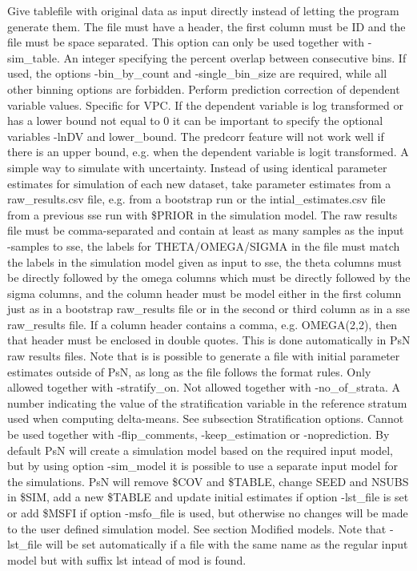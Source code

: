 \begin{optionlist}
\nextopt
{}
Give tablefile with original data as input directly instead of letting the program generate them. The file must have a header, the first column must be ID and the file must be space separated. This option can only be used together with -sim\_table.
\nextopt
{}
An integer specifying the percent overlap between consecutive bins. If used, the options -bin\_by\_count and -single\_bin\_size are required,
while all other binning options are forbidden.
Perform prediction correction of dependent variable values. Specific for VPC. If the dependent variable is log transformed or has a lower bound not equal to 0 it can be important to specify the optional variables -lnDV and lower\_bound. The predcorr feature will not work well if there is an upper bound, e.g. when the dependent variable is logit transformed. 
\nextopt
{}
A simple way to simulate with uncertainty. Instead of using identical parameter estimates for simulation of each new dataset, take parameter estimates from a raw\_results.csv file, e.g. from a bootstrap run or the intial\_estimates.csv file from a previous sse run with \$PRIOR in the simulation model. The raw results file must be comma-separated and contain at least as many samples as the input -samples to sse, the labels for  THETA/OMEGA/SIGMA in the file must match the labels in the simulation model given as input to sse, the theta columns must be directly followed by the omega columns which must be directly followed by the sigma columns, and the column header must be model either in the first column just as in a bootstrap raw\_results file or in the second or third column as in a sse raw\_results file. If a column header contains a comma, e.g. OMEGA(2,2), then that header must be enclosed in double quotes. This is done automatically in PsN raw results files. Note that is is possible to generate a file with initial parameter estimates outside of PsN, as long as the file follows the format rules. 
\nextopt
{}
Only allowed together with -stratify\_on. Not allowed together with -no\_of\_strata.
A number indicating the value of the stratification variable in the reference stratum used when computing delta-means.
See subsection Stratification options.  
\nextopt
{}
Cannot be used together with -flip\_comments, \mbox{-keep\_estimation} or -noprediction. By default PsN will create a simulation model based on the  required input model, but by using option -sim\_model it is possible to use a separate input model for the simulations. PsN will remove \$COV and \mbox{\$TABLE}, change SEED and NSUBS in \$SIM, add a new \mbox{\$TABLE} and  update initial estimates if option -lst\_file is set or add \$MSFI if option -msfo\_file is used, but otherwise no changes will be made to the user defined simulation model. See section Modified models. Note that -lst\_file will be set automatically if a file with the same name as the regular input model but with suffix lst intead of mod is found. 

\end{optionlist}
